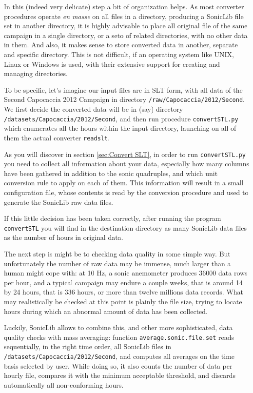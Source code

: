 \documentclass[a4paper,10pt]{book}
\begin{document}
In this (indeed very delicate) step a bit of organization helps. As most converter procedures operate \emph{en masse} on all files in a directory, producing a SonicLib file set in another directory, it is highly advisable to place all original file of the same campaign in a single directory, or a seto of related directories, with no other data in them. And also, it makes sense to store converted data in another, separate and specific directory. This is not difficult, if an operating system like UNIX, Linux or Windows is used, with their extensive support for creating and managing directories.

To be specific, let's imagine our input files are in SLT form, with all data of the Second Capocaccia 2012 Campaign in directory \verb|/raw/Capocaccia/2012/Second|. We first decide the converted data will be in (say) directory \verb|/datasets/Capocaccia/2012/Second|, and then run procedure \verb|convertSTL.py| which enumerates all the hours within the input directory, launching on all of them the actual converter \verb|readslt|.

As you will discover in section \ref{sec:Convert SLT}, in order to run \verb|convertSTL.py| you need to collect all information about your data, especially how many columns have been gathered in addition to the sonic quadruples, and which unit conversion rule to apply on each of them. This information will result in a small configuration file, whose contents is read by the conversion procedure and used to generate the SonicLib raw data files.

If this little decision has been taken correctly, after running the program \verb|convertSTL| you will find in the destination directory as many SonicLib data files as the number of hours in original data.

The next step is might be to checking data quality in some simple way. But unfortunately the number of raw data may be immense, much larger than a human might cope with: at 10 Hz, a sonic anemometer produces 36000 data rows per hour, and a typical campaign may endure a couple weeks, that is around 14 by 24 hours, that is 336 hours, or more than twelve millions data records. What may realistically be checked at this point is plainly the file size, trying to locate hours during which an abnormal amount of data has been collected.

Luckily, SonicLib allows to combine this, and other more sophisticated, data quality checks with mass averaging: function \verb|average.sonic.file.set| reads sequentially, in the right time order, all SonicLib files in \verb|/datasets/Capocaccia/2012/Second|, and computes all averages on the time basis selected by user. While doing so, it also counts the number of data per hourly file, compares it with the minimum acceptable threshold, and discards automatically all non-conforming hours.
\end{document}
